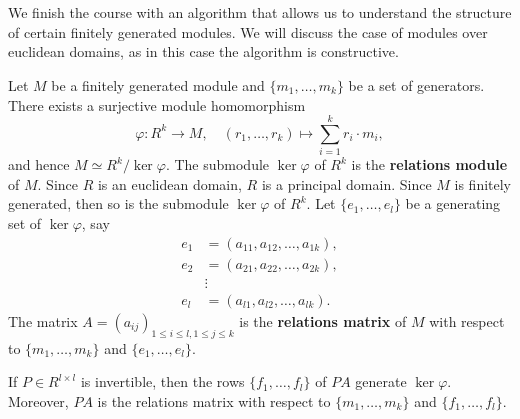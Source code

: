 \chapter{}


We finish the course with an algorithm that allows us to understand the
structure of certain finitely generated modules.  We will discuss the case of
modules over euclidean domains, as in this case the algorithm is constructive. 


Let $M$ be a finitely generated module and $\{m_1,\dots,m_k\}$ be a set of
generators.  There exists a surjective module homomorphism 
\[
	\varphi\colon R^k\to M, 
	\quad
	(r_1,\dots,r_k)\mapsto \sum_{i=1}^k r_i\cdot m_i,
\]
and hence 
$M\simeq R^k/\ker\varphi$. 
The submodule $\ker\varphi$ of $R^k$ is the \textbf{relations module} of $M$. 
Since $R$ is an euclidean domain, $R$ is a principal domain. Since 
$M$ is finitely generated, then so is the submodule $\ker\varphi$ of $R^k$. Let 
$\{e_1,\dots,e_l\}$ be a generating set of $\ker\varphi$, say 
\begin{align*}
e_1&=(a_{11},a_{12},\dots,a_{1k}),\\
e_2&=(a_{21},a_{22},\dots,a_{2k}),\\
&\vdots\\
e_l&=(a_{l1},a_{l2},\dots,a_{lk}).	
\end{align*}
The matrix $A=(a_{ij})_{1\leq i\leq l,1\leq j\leq k}$ is the 
\textbf{relations matrix} of $M$ with respect to $\{m_1,\dots,m_k\}$ 
and $\{e_1,\dots,e_l\}$. 

\begin{claim}
		If $P\in R^{l\times l}$ is invertible, then the rows
		$\{f_1,\dots,f_l\}$ of $PA$ generate $\ker\varphi$. Moreover, $PA$ is
		the relations matrix with respect to $\{m_1,\dots,m_k\}$ and
		$\{f_1,\dots,f_l\}$. 
\end{claim}


